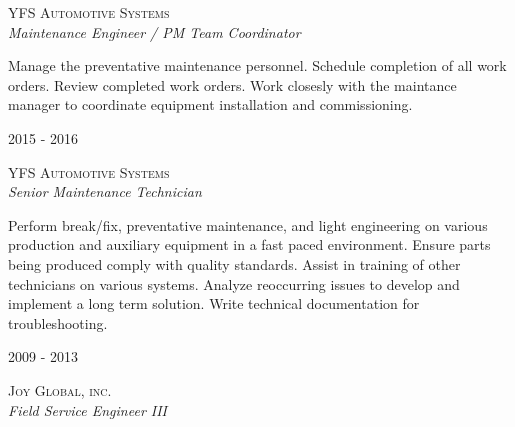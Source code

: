 \documentclass[10pt]{article} %
\begin{document}
\begin{minipage}[t]{0.5\textwidth}
{\raggedright\large\textsc{YFS Automotive Systems}\\
\textit{Maintenance Engineer / PM Team Coordinator}\\[5pt]}
\normalsize{Manage the preventative maintenance personnel. Schedule completion of all work orders. Review completed work orders. Work closesly with the maintance manager to coordinate equipment installation and commissioning.} 
\smallskip


{\raggedleft\textsc{2015 - 2016}\par}

{\raggedright\large\textsc{YFS Automotive Systems}\\
\textit{Senior Maintenance Technician}\\[5pt]}
\normalsize{Perform break/fix, preventative maintenance, and light engineering on various production and auxiliary equipment in a fast paced environment. Ensure parts being produced comply with quality standards. Assist in training of other technicians on various systems. Analyze reoccurring issues to develop and implement a long term solution. Write technical documentation for troubleshooting.} 
\smallskip





{\raggedleft\textsc{2009 - 2013}\par}

{\raggedright\large\textsc{Joy Global, inc.}\\
\textit{Field Service Engineer III}\\[5pt]}


\end{minipage}
\end{document}
